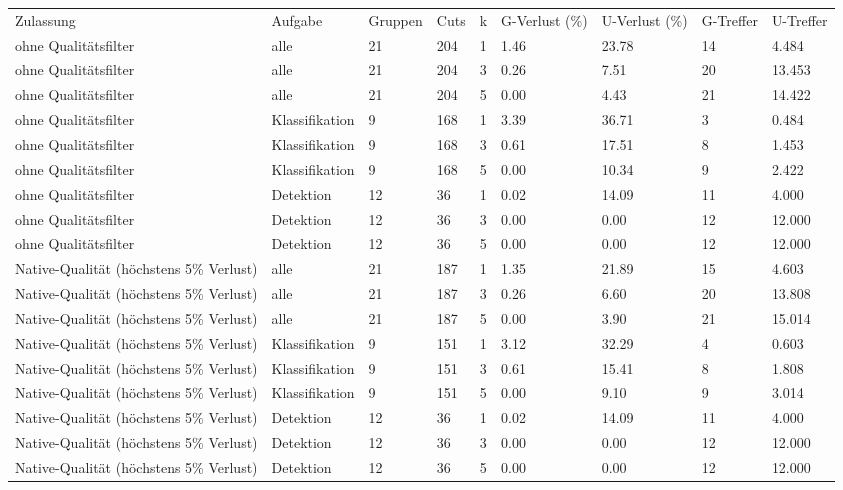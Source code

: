 \begin{tabular}{lllllllll}
Zulassung & Aufgabe & Gruppen & Cuts & k & G-Verlust (\%) & U-Verlust (\%) & G-Treffer & U-Treffer \\
ohne Qualitätsfilter & alle & 21 & 204 & 1 & 1.46 & 23.78 & 14 & 4.484 \\
ohne Qualitätsfilter & alle & 21 & 204 & 3 & 0.26 & 7.51 & 20 & 13.453 \\
ohne Qualitätsfilter & alle & 21 & 204 & 5 & 0.00 & 4.43 & 21 & 14.422 \\
ohne Qualitätsfilter & Klassifikation & 9 & 168 & 1 & 3.39 & 36.71 & 3 & 0.484 \\
ohne Qualitätsfilter & Klassifikation & 9 & 168 & 3 & 0.61 & 17.51 & 8 & 1.453 \\
ohne Qualitätsfilter & Klassifikation & 9 & 168 & 5 & 0.00 & 10.34 & 9 & 2.422 \\
ohne Qualitätsfilter & Detektion & 12 & 36 & 1 & 0.02 & 14.09 & 11 & 4.000 \\
ohne Qualitätsfilter & Detektion & 12 & 36 & 3 & 0.00 & 0.00 & 12 & 12.000 \\
ohne Qualitätsfilter & Detektion & 12 & 36 & 5 & 0.00 & 0.00 & 12 & 12.000 \\
Native-Qualität (höchstens 5\% Verlust) & alle & 21 & 187 & 1 & 1.35 & 21.89 & 15 & 4.603 \\
Native-Qualität (höchstens 5\% Verlust) & alle & 21 & 187 & 3 & 0.26 & 6.60 & 20 & 13.808 \\
Native-Qualität (höchstens 5\% Verlust) & alle & 21 & 187 & 5 & 0.00 & 3.90 & 21 & 15.014 \\
Native-Qualität (höchstens 5\% Verlust) & Klassifikation & 9 & 151 & 1 & 3.12 & 32.29 & 4 & 0.603 \\
Native-Qualität (höchstens 5\% Verlust) & Klassifikation & 9 & 151 & 3 & 0.61 & 15.41 & 8 & 1.808 \\
Native-Qualität (höchstens 5\% Verlust) & Klassifikation & 9 & 151 & 5 & 0.00 & 9.10 & 9 & 3.014 \\
Native-Qualität (höchstens 5\% Verlust) & Detektion & 12 & 36 & 1 & 0.02 & 14.09 & 11 & 4.000 \\
Native-Qualität (höchstens 5\% Verlust) & Detektion & 12 & 36 & 3 & 0.00 & 0.00 & 12 & 12.000 \\
Native-Qualität (höchstens 5\% Verlust) & Detektion & 12 & 36 & 5 & 0.00 & 0.00 & 12 & 12.000 \\
\end{tabular}
